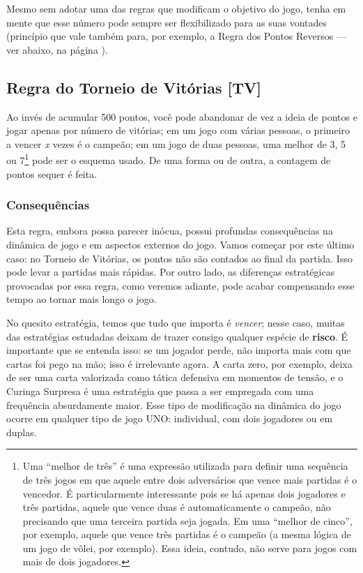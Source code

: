Mesmo sem adotar uma das regras que modificam o objetivo do jogo, tenha em mente que esse número pode sempre ser flexibilizado para as suas vontades (princípio que vale também para, por exemplo, a Regra dos Pontos Reversos --- ver abaixo, na página \pageref{pontosreversos}). 

\subsection{Regra do Torneio de Vitórias [TV]}

Ao invés de acumular 500 pontos, você pode abandonar de vez a ideia de pontos e jogar apenas por número de vitórias; em um jogo com várias pessoas, o primeiro a vencer \textit{x} vezes é o campeão; em um jogo de duas pessoas, uma melhor de 3, 5 ou 7\footnote{Uma ``melhor de três'' é uma expressão utilizada para definir uma sequência de três jogos em que aquele entre dois adversários que vence mais partidas é o vencedor. É particularmente interessante pois se há apenas dois jogadores e três partidas, aquele que vence duas é automaticamente o campeão, não precisando que uma terceira partida seja jogada. Em uma ``melhor de cinco'', por exemplo, aquele que vence três partidas é o campeão (a mesma lógica de um jogo de vôlei, por exemplo). Essa ideia, contudo, não serve para jogos com mais de dois jogadores.} pode ser o esquema usado. De uma forma ou de outra, a contagem de pontos sequer é feita.

\subsubsection{Consequências}

Esta regra, embora possa parecer inócua, possui profundas consequências na dinâmica de jogo e em aspectos externos do jogo. Vamos começar por este último caso: no Torneio de Vitórias, os pontos não são contados ao final da partida. Isso pode levar a partidas mais rápidas. Por outro lado, as diferenças estratégicas provocadas por essa regra, como veremos adiante, pode acabar compensando esse tempo ao tornar mais longo o jogo.

No quesito estratégia, temos que tudo que importa é \textit{vencer}; nesse caso, muitas das estratégias estudadas deixam de trazer consigo qualquer espécie de \textbf{risco}. É importante que se entenda isso: se um jogador perde, não importa mais com que cartas foi pego na mão; isso é irrelevante agora. A carta zero, por exemplo, deixa de ser uma carta valorizada como tática defensiva em momentos de tensão, e o Curinga Surpresa é uma estratégia que passa a ser empregada com uma frequência absurdamente maior. Esse tipo de modificação na dinâmica do jogo ocorre em qualquer tipo de jogo UNO: individual, com dois jogadores ou em duplas.

